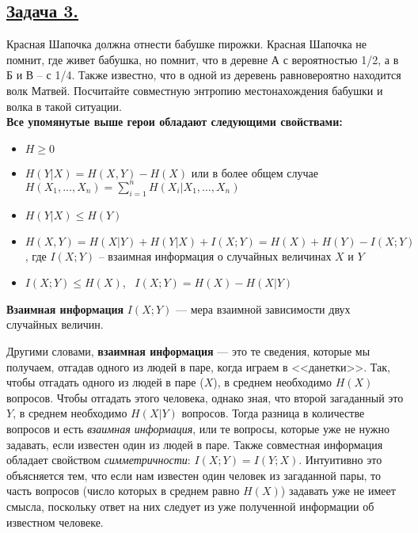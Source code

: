 \subsection*{\hyperref[sec:sol_problem3]{Задача 3.}}\label{sec:problem3} Красная Шапочка должна отнести бабушке пирожки. Красная Шапочка не помнит, где живет бабушка, но помнит, что в деревне А с вероятностью 1/2, а в Б и В – с 1/4. Также известно, что в одной из деревень равновероятно находится волк Матвей. Посчитайте совместную энтропию местонахождения бабушки и волка в такой ситуации.
\\ 

\textbf{Все упомянутые выше герои обладают следующими свойствами:}

\begin{itemize}
    \item $H \geqslant 0$
    \item $H(Y|X)=H(X, Y)-H(X)$ или в более общем случае $H(X_1, \ldots, X_n)=\sum\limits_{i=1}^n H(X_i|X_1, \ldots, X_n)$
    \item $H(Y|X)\leqslant H(Y)$
    \item $H(X, Y)=H(X|Y)+H(Y|X)+I(X; Y)=H(X)+H(Y)-I(X; Y)$, где $I(X; Y)$ -- взаимная информация о случайных величинах $X$ и $Y$
    \item $I(X; Y)\leqslant H(X)$, \ $I(X; Y)=H(X)-H(X|Y)$
\end{itemize}

\begin{siderules}
    \textbf{Взаимная информация} $I(X; Y)$ --- мера взаимной зависимости двух случайных величин.
\end{siderules}

Другими словами, \textbf{взаимная информация} --- это те сведения, которые мы получаем, отгадав одного из людей в паре, когда играем в <<данетки>>. Так, чтобы отгадать одного из людей в паре ($X$), в среднем необходимо $H(X)$ вопросов. Чтобы отгадать этого человека, однако зная, что второй загаданный это $Y$, в среднем необходимо $H(X|Y)$ вопросов. Тогда разница в количестве вопросов и есть \textit{взаимная информация}, или те вопросы, которые уже не нужно задавать, если известен один из людей в паре. Также совместная информация обладает свойством \textit{симметричности}: $I(X;Y)=I(Y;X)$. Интуитивно это объясняется тем, что если нам известен один человек из загаданной пары, то часть вопросов (число которых в среднем равно $H(X)$) задавать уже не имеет смысла, поскольку ответ на них следует из уже полученной информации об известном человеке. 

